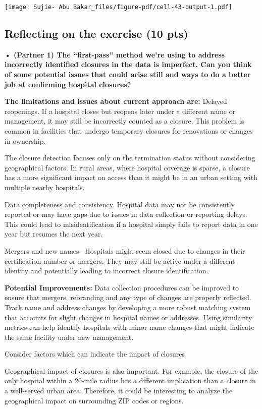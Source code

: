 \documentclass[
  letterpaper,
  DIV=11,
  numbers=noendperiod]{scrartcl}
\begin{document}
\texttt{[image: Sujie- Abu Bakar\_files/figure-pdf/cell-43-output-1.pdf]}

\subsection{Reflecting on the exercise (10
pts)}\label{reflecting-on-the-exercise-10-pts}

\textbf{• (Partner 1) The ``first-pass'' method we're using to address
incorrectly identified closures in the data is imperfect. Can you think
of some potential issues that could arise still and ways to do a better
job at confirming hospital closures?}

\textbf{The limitations and issues about current approach are:} Delayed
reopenings. If a hospital closes but reopens later under a different
name or management, it may still be incorrectly counted as a closure.
This problem is common in facilities that undergo temporary closures for
renovations or changes in ownership.

The closure detection focuses only on the termination status without
considering geographical factors. In rural areas, where hospital
coverage is sparse, a closure has a more significant impact on access
than it might be in an urban setting with multiple nearby hospitals.

Data completeness and consistency. Hospital data may not be consistently
reported or may have gaps due to issues in data collection or reporting
delays. This could lead to misidentification if a hospital simply fails
to report data in one year but resumes the next year.

Mergers and new names-- Hospitals might seem closed due to changes in
their certification number or mergers. They may still be active under a
different identity and potentially leading to incorrect closure
identification.

\textbf{Potential Improvements:} Data collection procedures can be
improved to ensure that mergers, rebranding and any type of changes are
properly reflected. Track name and address changes by developing a more
robust matching system that accounts for slight changes in hospital
names or addresses. Using similarity metrics can help identify hospitals
with minor name changes that might indicate the same facility under new
management.

Consider factors which can indicate the impact of closures

Geographical impact of closures is also important. For example, the
closure of the only hospital within a 20-mile radius has a different
implication than a closure in a well-served urban area. Therefore, it
could be interesting to analyze the geographical impact on surrounding
ZIP codes or regions.
\end{document}
